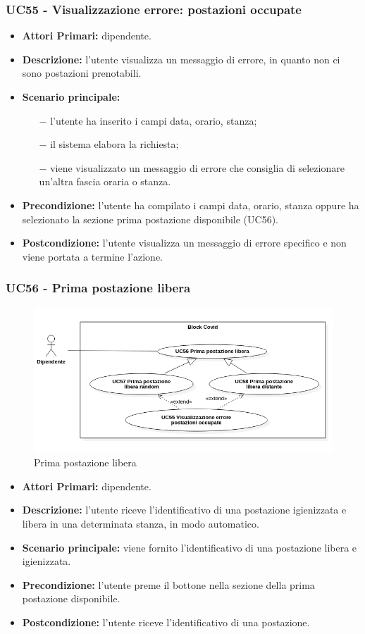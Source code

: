 \subsubsection{ UC55 - Visualizzazione errore: postazioni occupate }
\begin{itemize}
	\item\textbf{Attori Primari:} dipendente.
	\item\textbf{Descrizione:} l’utente visualizza un messaggio di errore, in quanto non ci sono postazioni prenotabili.
	\item\textbf{Scenario principale:} 
	\begin{itemize}
		\item[$-$] l’utente ha inserito i campi data, orario, stanza;
		\item[$-$] il sistema elabora la richiesta;
		\item[$-$] viene visualizzato un messaggio di errore che consiglia di selezionare un'altra fascia oraria o stanza.
	\end{itemize}
	\item\textbf{Precondizione:} l’utente ha compilato i campi data, orario, stanza oppure ha selezionato la sezione prima postazione disponibile (UC56).
	\item\textbf{Postcondizione:} l’utente visualizza un messaggio di errore specifico e non viene portata a termine l'azione.
\end{itemize}
\subsubsection{ UC56 - Prima postazione libera }
\begin{figure}[H]
	\centering
	\includegraphics[width=18cm]{res/images/UC55-56-57-58.png}
	\caption{Prima postazione libera}
	\label{fig:Prima postazione libera}
\end{figure}
\begin{itemize}
	\item\textbf{Attori Primari:} dipendente.
	\item\textbf{Descrizione:} l’utente riceve l'identificativo di una postazione igienizzata e libera in una determinata stanza, 
	in modo automatico.
	\item\textbf{Scenario principale:} viene fornito l'identificativo di una postazione libera e igienizzata.
	\item\textbf{Precondizione:} l’utente preme il bottone nella sezione della prima postazione disponibile.
	\item\textbf{Postcondizione:} l’utente riceve l'identificativo di una postazione.
\end{itemize}
